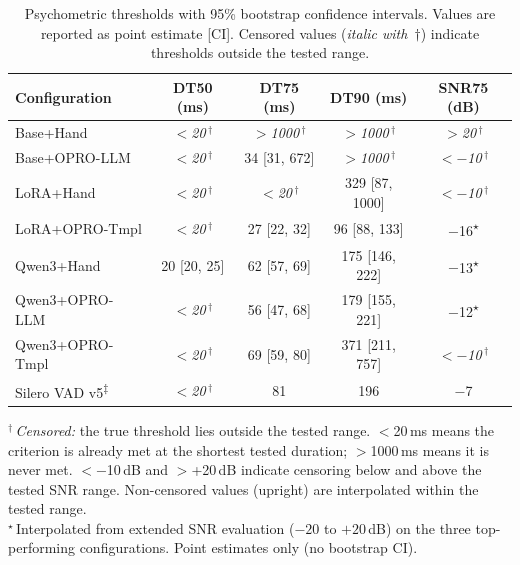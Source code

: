 \begin{table}[ht]
\centering
\caption{Psychometric thresholds with 95\% bootstrap confidence intervals. Values are reported as point estimate [CI]. Censored values (\textit{italic with~$\dagger$}) indicate thresholds outside the tested range.}
\label{tab:psychometric_thresholds}
\begin{tabular}{lcccc}
\toprule
\textbf{Configuration} & \textbf{DT50 (ms)} & \textbf{DT75 (ms)} & \textbf{DT90 (ms)} & \textbf{SNR75 (dB)} \\
\midrule
Base+Hand & \textit{$<$20\,$^\dagger$} & \textit{$>$1000\,$^\dagger$} & \textit{$>$1000\,$^\dagger$} & \textit{$>$20\,$^\dagger$} \\
Base+OPRO-LLM & \textit{$<$20\,$^\dagger$} & 34 [31, 672] & \textit{$>$1000\,$^\dagger$} & \textit{$<$$-$10\,$^\dagger$} \\
LoRA+Hand & \textit{$<$20\,$^\dagger$} & \textit{$<$20\,$^\dagger$} & 329 [87, 1000] & \textit{$<$$-$10\,$^\dagger$} \\
LoRA+OPRO-Tmpl & \textit{$<$20\,$^\dagger$} & 27 [22, 32] & 96 [88, 133] & $-$16\textsuperscript{$\star$} \\
\midrule
Qwen3+Hand & 20 [20, 25] & 62 [57, 69] & 175 [146, 222] & $-$13\textsuperscript{$\star$} \\
Qwen3+OPRO-LLM & \textit{$<$20\,$^\dagger$} & 56 [47, 68] & 179 [155, 221] & $-$12\textsuperscript{$\star$} \\
Qwen3+OPRO-Tmpl & \textit{$<$20\,$^\dagger$} & 69 [59, 80] & 371 [211, 757] & \textit{$<$$-$10\,$^\dagger$} \\
\midrule
Silero VAD v5\textsuperscript{$\ddagger$} & \textit{$<$20\,$^\dagger$} & 81 & 196 & $-$7 \\
\bottomrule
\end{tabular}

\vspace{0.4em}
\begin{flushleft}
\footnotesize
$^\dagger$\,\textit{Censored:} the true threshold lies outside the tested range. $<$20\,ms means the criterion is already met at the shortest tested duration; $>$1000\,ms means it is never met. $<$$-$10\,dB and $>$+20\,dB indicate censoring below and above the tested SNR range. Non-censored values (upright) are interpolated within the tested range.\\[0.3em]
$^\star$\,Interpolated from extended SNR evaluation ($-20$ to $+20$\,dB) on the three top-performing configurations. Point estimates only (no bootstrap CI).
\end{flushleft}
\end{table}